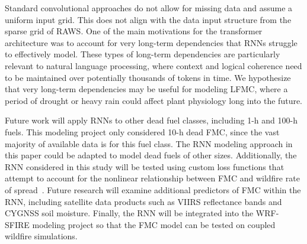 \documentclass[fire,article,submit,pdftex,moreauthors]{Definitions/mdpi}
\begin{document}
Standard convolutional approaches do not allow for missing data and assume a uniform input grid. This does not align with the data input structure from the sparse grid of RAWS. One of the main motivations for the transformer architecture was to account for very long-term dependencies that RNNs struggle to effectively model. These types of long-term dependencies are particularly relevant to natural language processing, where context and logical coherence need to be maintained over potentially thousands of tokens in time. We hypothesize that very long-term dependencies may be useful for modeling LFMC, where a period of drought or heavy rain could affect plant physiology long into the future.

Future work will apply RNNs to other dead fuel classes, including 1-h and 100-h fuels. This modeling project only considered 10-h dead FMC, since the vast majority of available data is for this fuel class. The RNN modeling approach in this paper could be adapted to model dead fuels of other sizes. Additionally, the RNN considered in this study will be tested using custom loss functions that attempt to account for the nonlinear relationship between FMC and wildfire rate of spread~\citep{Hirschi-2025-CLF}. Future research will examine additional predictors of FMC within the RNN, including satellite data products such as VIIRS reflectance bands and CYGNSS soil moisture. Finally, the RNN will be integrated into the WRF-SFIRE modeling project so that the FMC model can be tested on coupled wildfire simulations.
\end{document}
